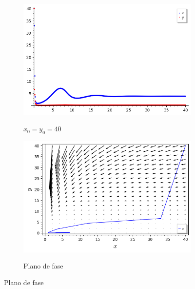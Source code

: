 \begin{figure}[H]
    \centering
    \begin{subfigure}{0.4\textwidth}
        \includegraphics[scale=0.48]{figuras/HT_17.png}
        \label{fig:HT_17}
        \caption{$x_0 = y_0 = 40$}
    \end{subfigure}
    \begin{subfigure}{0.4\textwidth}
        \includegraphics[scale=0.48]{figuras/HT_18.png}
        \label{fig:HT_18}
        \caption{Plano de fase}
    \end{subfigure}
\end{figure}


